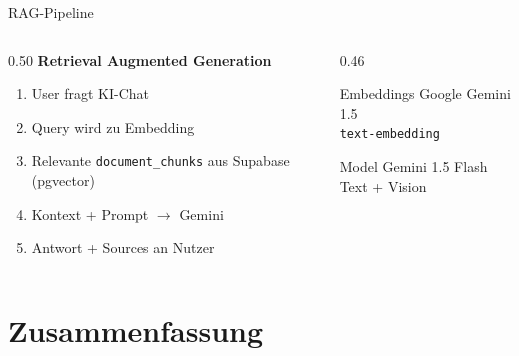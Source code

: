 \documentclass[aspectratio=169,11pt]{beamer}
\begin{document}
\begin{frame}{RAG-Pipeline}
  \begin{columns}[T]
    \begin{column}{0.50\textwidth}
      \textbf{Retrieval Augmented Generation}
      \begin{enumerate}
        \item User fragt KI-Chat
        \item Query wird zu Embedding
        \item Relevante \texttt{document\_chunks} aus Supabase (pgvector)
        \item Kontext + Prompt $\to$ Gemini
        \item Antwort + Sources an Nutzer
      \end{enumerate}
    \end{column}
    \begin{column}{0.46\textwidth}
      \begin{block}{Embeddings}
        Google Gemini 1.5\\
        \texttt{text-embedding}
      \end{block}
      \vspace{6pt}
      \begin{block}{Model}
        Gemini 1.5 Flash\\
        Text + Vision
      \end{block}
    \end{column}
  \end{columns}
\end{frame}

\section{Zusammenfassung}
\end{document}
